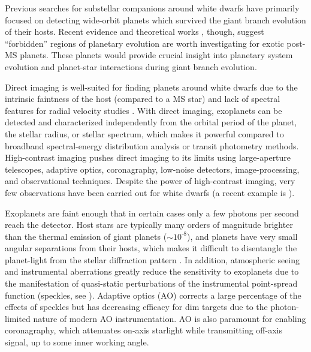 \documentclass[twocolumn]{aastex631}
\begin{document}
Previous searches for substellar companions around white dwarfs \citep[e.g.,][]{debesAreThereUnstable2002,hoganDODOSurveyII2009,luhmanDiscoveryCandidateCoolest2011,xuExtremeAOSearchGiant2015a} have primarily focused on detecting wide-orbit planets which survived the giant branch evolution of their hosts. Recent evidence and theoretical works \citep[e.g.,][]{xuSpitzerObservationsWhite2012,koesterFrequencyPlanetaryDebris2014,verasPostmainsequencePlanetarySystem2016,vanderburgGiantPlanetCandidate2020}, though, suggest ``forbidden'' regions of planetary evolution are worth investigating for exotic post-MS planets. These planets would provide crucial insight into planetary system evolution and planet-star interactions during giant branch evolution.

Direct imaging is well-suited for finding planets around white dwarfs due to the intrinsic faintness of the host (compared to a MS star) and lack of spectral features for radial velocity studies \citep{burleighImagingPlanetsNearby2002a}. With direct imaging, exoplanets can be detected and characterized independently from the orbital period of the planet, the stellar radius, or stellar spectrum, which makes it powerful compared to broadband spectral-energy distribution analysis or transit photometry methods. High-contrast imaging pushes direct imaging to its limits using large-aperture telescopes, adaptive optics, coronagraphy, low-noise detectors, image-processing, and observational techniques. Despite the power of high-contrast imaging, very few observations have been carried out for white dwarfs (a recent example is \citealt{pathakHighContrastImaging2021}).

Exoplanets are faint enough that in certain cases only a few photons per second reach the detector. Host stars are typically many orders of magnitude brighter than the thermal emission of giant planets ($\sim10^{\text{-}8}$), and planets have very small angular separations from their hosts, which makes it difficult to disentangle the planet-light from the stellar diffraction pattern \citep{traubDirectImagingExoplanets2010}. In addition, atmospheric seeing and instrumental aberrations greatly reduce the sensitivity to exoplanets due to the manifestation of quasi-static perturbations of the instrumental point-spread function (speckles, see \citealp{guyonExtremeAdaptiveOptics2018}). Adaptive optics (AO) corrects a large percentage of the effects of speckles but has decreasing efficacy for dim targets due to the photon-limited nature of modern AO instrumentation. AO is also paramount for enabling coronagraphy, which attenuates on-axis starlight while transmitting off-axis signal, up to some inner working angle.
\end{document}
